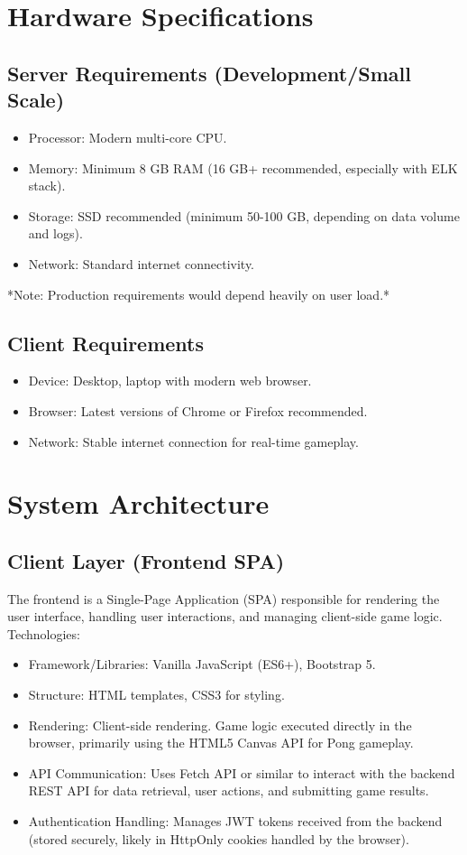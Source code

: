 \section*{Hardware Specifications}
\subsection*{Server Requirements (Development/Small Scale)}
\begin{itemize}
    \item Processor: Modern multi-core CPU.
    \item Memory: Minimum 8 GB RAM (16 GB+ recommended, especially with ELK stack).
    \item Storage: SSD recommended (minimum 50-100 GB, depending on data volume and logs).
    \item Network: Standard internet connectivity.
\end{itemize}
*Note: Production requirements would depend heavily on user load.*

\subsection*{Client Requirements}
\begin{itemize}
    \item Device: Desktop, laptop with modern web browser.
    \item Browser: Latest versions of Chrome or Firefox recommended.
    \item Network: Stable internet connection for real-time gameplay.
\end{itemize}

\section*{System Architecture}
\subsection*{Client Layer (Frontend SPA)}
The frontend is a Single-Page Application (SPA) responsible for rendering the user interface, handling user interactions, and managing client-side game logic. Technologies:
\begin{itemize}
    \item Framework/Libraries: Vanilla JavaScript (ES6+), Bootstrap 5.
    \item Structure: HTML templates, CSS3 for styling.
    \item Rendering: Client-side rendering. Game logic executed directly in the browser, primarily using the HTML5 Canvas API for Pong gameplay.
    \item API Communication: Uses Fetch API or similar to interact with the backend REST API for data retrieval, user actions, and submitting game results.
    \item Authentication Handling: Manages JWT tokens received from the backend (stored securely, likely in HttpOnly cookies handled by the browser).
\end{itemize}

